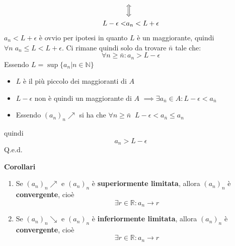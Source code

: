 {\begin{enumerate}
\begin{align*}
            &\Big\Updownarrow\\
            L - \epsilon < &a_n < L + \epsilon
        \end{align*}
        $a_n < L + \epsilon$ è ovvio per ipotesi in quanto $L$ è un maggiorante, quindi $\forall n \; a_n \leq L < L + \epsilon$. Ci rimane quindi solo da trovare $\bar{n}$ tale che:
        \begin{equation*}
            \forall n \geq \bar{n} : a_n > L - \epsilon
        \end{equation*}
        Essendo $L = \sup \{a_n | n \in \mathbb{N}\}$
        \begin{itemize}
            \item $L$ è il più piccolo dei maggioranti di $A$
            \item $L - \epsilon$ non è quindi un maggiorante di $A$ $\implies \exists a_{\bar{n}} \in A : L -\epsilon < a_{\bar{n}}$
            \item Essendo $(a_n)_n \nearrow$ si ha che $\forall n \geq \bar{n} \;\; L-\epsilon < a_{\bar{n}} \leq a_{n}$
        \end{itemize}
        quindi
        \begin{equation*}
            a_n > L - \epsilon
        \end{equation*}
        \hfill Q.e.d.
\end{enumerate}
}
\textbf{Corollari} \label{corol_successioni}
\begin{enumerate}
    \item Se $(a_n)_n \nearrow$ e $(a_n)_n$ è \textbf{superiormente limitata}, allora $(a_n)_n$ è \textbf{convergente}, cioè
        \begin{equation*}
            \exists r \in \mathbb{R} : a_n \xrightarrow{\quad} r
        \end{equation*}
    \item Se $(a_n)_n \searrow$ e $(a_n)_n$ è \textbf{inferiormente limitata}, allora $(a_n)_n$ è \textbf{convergente}, cioè
        \begin{equation*}
            \exists r \in \mathbb{R} : a_n \xrightarrow{\quad} r
        \end{equation*}
\end{enumerate}

